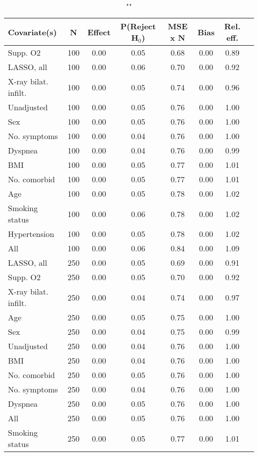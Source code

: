 \documentclass{article}
\begin{document}
{\tabcolsep=6pt  %
\begin{longtable}{lccccccc}
\caption{""} \\
Covariate(s) & N & Effect & P(Reject H$_0$) & MSE x N & Bias & Rel. eff.\\ \midrule
Supp. O2 & 100 & 0.00 & 0.05 & 0.68 & 0.00 & 0.89 \\ 
LASSO, all & 100 & 0.00 & 0.06 & 0.70 & 0.00 & 0.92 \\ 
X-ray bilat. infilt. & 100 & 0.00 & 0.05 & 0.74 & 0.00 & 0.96 \\ 
Unadjusted & 100 & 0.00 & 0.05 & 0.76 & 0.00 & 1.00 \\ 
Sex & 100 & 0.00 & 0.05 & 0.76 & 0.00 & 1.00 \\ 
No. symptoms & 100 & 0.00 & 0.04 & 0.76 & 0.00 & 1.00 \\ 
Dyspnea & 100 & 0.00 & 0.04 & 0.76 & 0.00 & 0.99 \\ 
BMI & 100 & 0.00 & 0.05 & 0.77 & 0.00 & 1.01 \\ 
No. comorbid & 100 & 0.00 & 0.05 & 0.77 & 0.00 & 1.01 \\ 
Age & 100 & 0.00 & 0.05 & 0.78 & 0.00 & 1.02 \\ 
Smoking status & 100 & 0.00 & 0.06 & 0.78 & 0.00 & 1.02 \\ 
Hypertension & 100 & 0.00 & 0.05 & 0.78 & 0.00 & 1.02 \\ 
All & 100 & 0.00 & 0.06 & 0.84 & 0.00 & 1.09 \\ \midrule 
LASSO, all & 250 & 0.00 & 0.05 & 0.69 & 0.00 & 0.91 \\ 
Supp. O2 & 250 & 0.00 & 0.05 & 0.70 & 0.00 & 0.92 \\ 
X-ray bilat. infilt. & 250 & 0.00 & 0.04 & 0.74 & 0.00 & 0.97 \\ 
Age & 250 & 0.00 & 0.05 & 0.75 & 0.00 & 1.00 \\ 
Sex & 250 & 0.00 & 0.04 & 0.75 & 0.00 & 0.99 \\ 
Unadjusted & 250 & 0.00 & 0.04 & 0.76 & 0.00 & 1.00 \\ 
BMI & 250 & 0.00 & 0.04 & 0.76 & 0.00 & 1.00 \\ 
No. comorbid & 250 & 0.00 & 0.05 & 0.76 & 0.00 & 1.00 \\ 
No. symptoms & 250 & 0.00 & 0.04 & 0.76 & 0.00 & 1.00 \\ 
Dyspnea & 250 & 0.00 & 0.05 & 0.76 & 0.00 & 1.00 \\ 
All & 250 & 0.00 & 0.05 & 0.76 & 0.00 & 1.00 \\ 
Smoking status & 250 & 0.00 & 0.05 & 0.77 & 0.00 & 1.01 \\ 

\end{longtable}}
\end{document}
